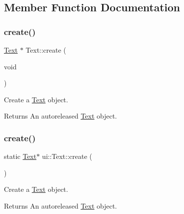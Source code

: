 \subsection{Member Function Documentation}
\mbox{\label{classui_1_1Text_aafdd02d8f0b256cb4997ada4f146e2c2}} 
\subsubsection{\texorpdfstring{create()}{create()}\hspace{0.1cm}{\footnotesize\ttfamily [1/4]}}
{\footnotesize\ttfamily \hyperlink{classui_1_1Text}{Text} $\ast$ Text\+::create (\begin{DoxyParamCaption}\item[{void}]{ }\end{DoxyParamCaption})\hspace{0.3cm}{\ttfamily [static]}}

Create a \hyperlink{classui_1_1Text}{Text} object.

\begin{DoxyReturn}{Returns}
An autoreleased \hyperlink{classui_1_1Text}{Text} object. 
\end{DoxyReturn}
\mbox{\label{classui_1_1Text_a286a19300b05c8fcd35e1fcbb80b8ab9}} 
\subsubsection{\texorpdfstring{create()}{create()}\hspace{0.1cm}{\footnotesize\ttfamily [2/4]}}
{\footnotesize\ttfamily static \hyperlink{classui_1_1Text}{Text}$\ast$ ui\+::\+Text\+::create (\begin{DoxyParamCaption}{ }\end{DoxyParamCaption})\hspace{0.3cm}{\ttfamily [static]}}

Create a \hyperlink{classui_1_1Text}{Text} object.

\begin{DoxyReturn}{Returns}
An autoreleased \hyperlink{classui_1_1Text}{Text} object. 
\end{DoxyReturn}
\mbox{\label{classui_1_1Text_a838f46893abea1084c823a8277f701d7}} 
